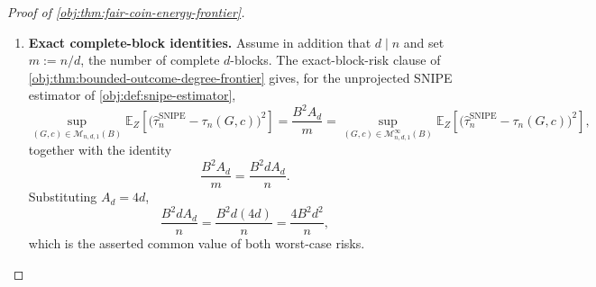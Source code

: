 \documentclass[11pt]{article}
\begin{document}
\begin{proof}[Proof of \cref{obj:thm:fair-coin-energy-frontier}]
\begin{enumerate}
\item \textbf{Exact complete-block identities.}
Assume in addition that \(d\mid n\) and set \(m:=n/d\), the number of complete \(d\)-blocks.  The exact-block-risk clause of \cref{obj:thm:bounded-outcome-degree-frontier} gives, for the unprojected SNIPE estimator of \cref{obj:def:snipe-estimator},
\[
\sup_{(G,c)\in\mathcal M_{n,d,1}(B)}
\mathbb E_Z\!\left[\bigl(\widehat\tau_n^{\mathrm{SNIPE}}-\tau_n(G,c)\bigr)^2\right]
=
\frac{B^2A_d}{m}
=
\sup_{(G,c)\in\mathcal M_{n,d,1}^{\infty}(B)}
\mathbb E_Z\!\left[\bigl(\widehat\tau_n^{\mathrm{SNIPE}}-\tau_n(G,c)\bigr)^2\right],
\]
together with the identity
\[
\frac{B^2A_d}{m}
=
\frac{B^2dA_d}{n}.
\]
Substituting \(A_d=4d\),
\[
\frac{B^2dA_d}{n}
=
\frac{B^2d(4d)}{n}
=
\frac{4B^2d^2}{n},
\]
which is the asserted common value of both worst-case risks.
\end{enumerate}
\end{proof}




\end{document}
